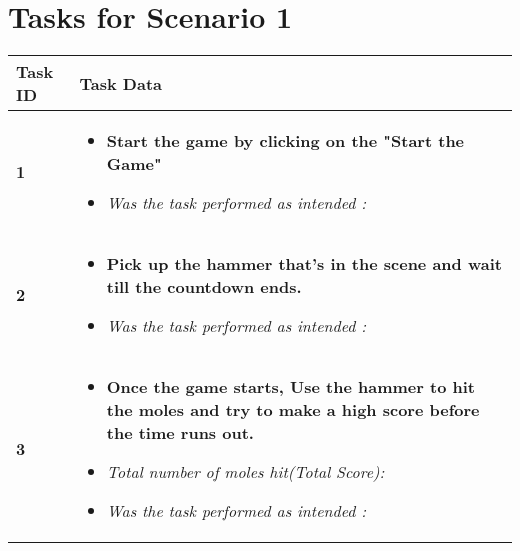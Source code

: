 \documentclass{article}
\begin{document}
\section*{Tasks for \textbf{Scenario 1}}
\begin{table}[htb]
	\centering
	\setlength{\leftmargini}{0.5cm}
	\begin{tabular}{| m{0.75cm} | m{10cm} |}
		\hline
		\textbf{Task ID} & \textbf{Task Data}                                                                                                                                       \\
		\hline \hfill \break
		\textbf{1}       &
		\begin{itemize}[label={}]
			\item \textbf{Start the game by clicking on the "Start the Game"}
			\item \textit{Was the task performed as intended :}
		\end{itemize}                                     \\
		\hline \hfill \break
		\textbf{2}       &
		\begin{itemize}[label={}]
			\item \textbf{Pick up the hammer that's in the scene and wait till the countdown ends.}
			\item \textit{Was the task performed as intended :}
		\end{itemize} \\
		\hline \hfill \break
		\textbf{3}       &
		\begin{itemize}[label={}]
			\item \textbf{Once the game starts, Use the hammer to hit the moles and try to make a high score before the time runs out.}
			\item \textit{Total number of moles hit(Total Score):}
			\item \textit{Was the task performed as intended :}
		\end{itemize} \\
		\hline
	\end{tabular}
\end{table}

\newpage
\end{document}
